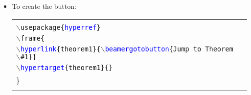 \documentclass[compress,red]{beamer}
\begin{document}
{\begin{itemize}
	OR, \texttt{$\backslash$label\{theorem1\}} \\\vspace{.1cm}
	\item \footnotesize To create the button:\\\vspace{.1cm}
\tiny
	\begin{tabular}{|ll|}
	\hline
	&\\
	\texttt{$\backslash$usepackage\{\textcolor{Blue}{hyperref}\}} &\\
	\texttt{$\backslash$frame\{} &\\
	\texttt{$\backslash$\textcolor{Blue}{hyperlink}\{theorem1\}\{$\backslash$\textcolor{Blue}{beamergotobutton}\{Jump to Theorem $\backslash$\#1\}\}} &\\
	\texttt{$\backslash$\textcolor{Blue}{hypertarget}\{theorem1\}\{\}} &\\
	\}&\\
	&\\\hline 
	\end{tabular}
\end{itemize}
}

\end{document}
